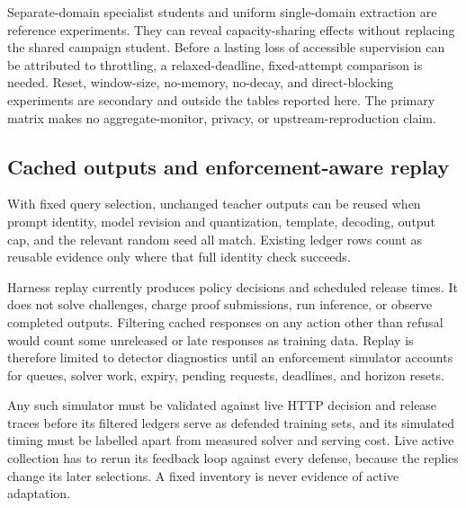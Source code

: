 \documentclass[journal]{IEEEtran}
\begin{document}
Separate-domain specialist students and uniform single-domain extraction are reference experiments. They can reveal capacity-sharing effects without replacing the shared campaign student. Before a lasting loss of accessible supervision can be attributed to throttling, a relaxed-deadline, fixed-attempt comparison is needed. Reset, window-size, no-memory, no-decay, and direct-blocking experiments are secondary and outside the tables reported here. The primary matrix makes no aggregate-monitor, privacy, or upstream-reproduction claim.

\subsection{Cached outputs and enforcement-aware replay}
\label{sec:replay}
With fixed query selection, unchanged teacher outputs can be reused when prompt identity, model revision and quantization, template, decoding, output cap, and the relevant random seed all match. Existing ledger rows count as reusable evidence only where that full identity check succeeds.

Harness replay currently produces policy decisions and scheduled release times. It does not solve challenges, charge proof submissions, run inference, or observe completed outputs. Filtering cached responses on any action other than refusal would count some unreleased or late responses as training data. Replay is therefore limited to detector diagnostics until an enforcement simulator accounts for queues, solver work, expiry, pending requests, deadlines, and horizon resets.

Any such simulator must be validated against live HTTP decision and release traces before its filtered ledgers serve as defended training sets, and its simulated timing must be labelled apart from measured solver and serving cost. Live active collection has to rerun its feedback loop against every defense, because the replies change its later selections. A fixed inventory is never evidence of active adaptation.
\end{document}
